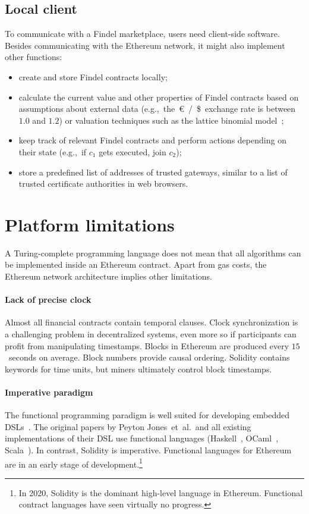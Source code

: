 \subsection{Local client}

To communicate with a Findel marketplace, users need client-side software.
Besides communicating with the Ethereum network, it might also implement other functions:
\begin{itemize}
	\item create and store Findel contracts locally;
	\item calculate the current value and other properties of Findel contracts based on assumptions about external data (e.g.,~the~\euro~/~\$~exchange rate is between $1.0$ and $1.2$) or valuation techniques such as the lattice binomial model~\cite{Cox1979};
	\item keep track of relevant Findel contracts and perform actions depending on their state (e.g.,~if \(c_1\) gets executed, join \(c_2\));
	\item store a predefined list of addresses of trusted gateways, similar to a list of trusted certificate authorities in web browsers.
\end{itemize}


\section{Platform limitations}

A Turing-complete programming language does not mean that all algorithms can be implemented inside an Ethereum contract.
Apart from gas costs, the Ethereum network architecture implies other limitations.

\paragraph{Lack of precise clock}
Almost all financial contracts contain temporal clauses.
Clock synchronization is a challenging problem in decentralized systems, even more so if participants can profit from manipulating timestamps.
Blocks in Ethereum are produced every $15$~seconds on average.
Block numbers provide causal ordering.
Solidity contains keywords for time units, but miners ultimately control block timestamps.

\paragraph{Imperative paradigm}
The functional programming paradigm is well suited for developing embedded DSLs~\cite{Gibbons2015}.
The original papers by Peyton Jones~et~al.\ and all existing implementations of their DSL use functional languages (Haskell~\cite{PeytonJones2000, Jones2003, Straaten2007}, OCaml~\cite{LexiFi}, Scala~\cite{Walton2012, Chaudhary2015}).
In contrast, Solidity is imperative.
Functional languages for Ethereum~\cite{FpEthereum2017} are in an early stage of development.\footnote{In 2020, Solidity is the dominant high-level language in Ethereum. Functional contract languages have seen virtually no progress.}

